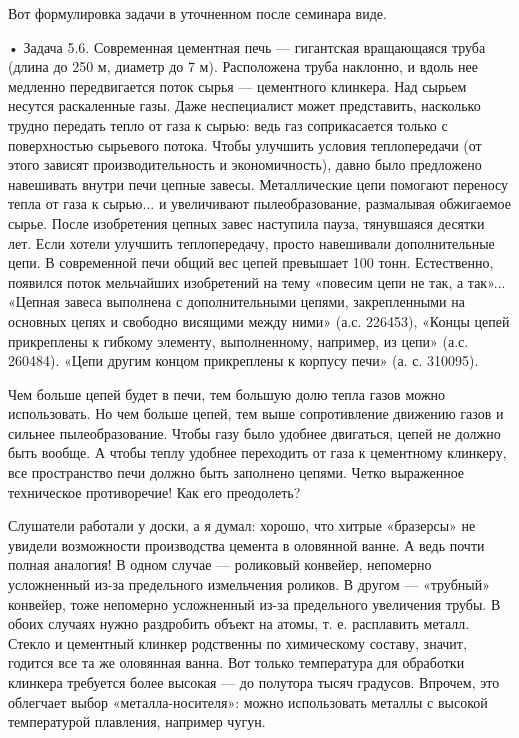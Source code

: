 Вот формулировка задачи в уточненном после семинара виде.

•  Задача 5.6.  Современная  цементная печь  — гигантская  вращающаяся
труба (длина до 250 м, диаметр  до 7 м). Расположена труба наклонно, и
вдоль нее  медленно передвигается  поток сырья —  цементного клинкера.
Над  сырьем   несутся  раскаленные   газы.  Даже   неспециалист  может
представить, насколько  трудно передать  тепло от  газа к  сырью: ведь
газ  соприкасается  только  с  поверхностью  сырьевого  потока.  Чтобы
улучшить условия теплопередачи (от  этого зависят производительность и
экономичность), давно  было предложено  навешивать внутри  печи цепные
завесы. Металлические цепи помогают переносу  тепла от газа к сырью...
и  увеличивают  пылеобразование,  размалывая обжигаемое  сырье.  После
изобретения цепных завес наступила пауза, тянувшаяся десятки лет. Если
хотели улучшить теплопередачу,  просто навешивали дополнительные цепи.
В современной  печи общий вес  цепей превышает 100  тонн. Естественно,
появился  поток  мельчайших  изобретений  на  тему  «повесим  цепи  не
так,  а так»...  «Цепная  завеса выполнена  с дополнительными  цепями,
закрепленными на основных цепях и  свободно висящими между ними» (а.с.
226453), «Концы  цепей прикреплены  к гибкому  элементу, выполненному,
например, из  цепи» (а.с. 260484).  «Цепи другим концом  прикреплены к
корпусу печи» (а. с. 310095).

Чем больше  цепей будет  в печи,  тем большую  долю тепла  газов можно
использовать.  Но чем  больше цепей,  тем выше  сопротивление движению
газов и  сильнее пылеобразование.  Чтобы газу было  удобнее двигаться,
цепей не должно быть вообще. А  чтобы теплу удобнее переходить от газа
к  цементному клинкеру,  все пространство  печи должно  быть заполнено
цепями. Четко выраженное техническое противоречие! Как его преодолеть?


Слушатели работали у  доски, а я думал: хорошо,  что хитрые «бразерсы»
не  увидели  возможности производства  цемента  в  оловянной ванне.  А
ведь  почти полная  аналогия!  В одном  случае  — роликовый  конвейер,
непомерно усложненный из-за предельного  измельчения роликов. В другом
—  «трубный» конвейер,  тоже непомерно  усложненный из-за  предельного
увеличения трубы. В обоих случаях нужно раздробить объект на атомы, т.
е.  расплавить  металл.  Стекло  и  цементный  клинкер  родственны  по
химическому  составу,  значит,  годится  все та  же  оловянная  ванна.
Вот  только   температура  для  обработки  клинкера   требуется  более
высокая —  до полутора  тысяч градусов.  Впрочем, это  облегчает выбор
«металла-носителя»: можно использовать  металлы с высокой температурой
плавления, например чугун.

